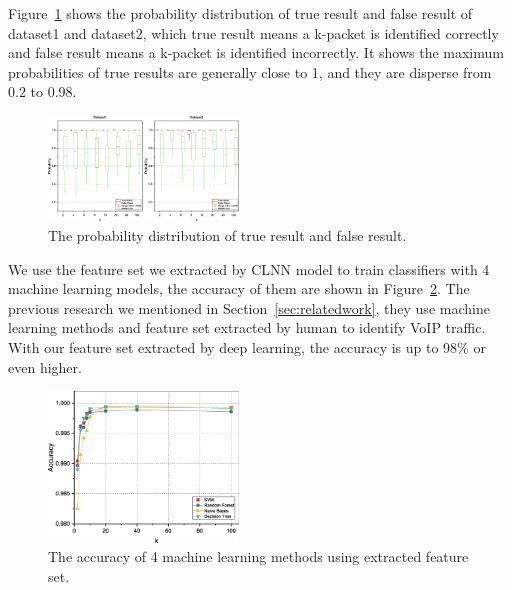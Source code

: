 \documentclass[conference]{IEEEtran}
\begin{document}
Figure~\ref{fig:tf} shows the probability distribution of true result and false result of dataset1 and dataset2, which true result means a k-packet is identified correctly and false result means a k-packet is identified incorrectly. It shows the maximum probabilities of true results are generally close to 1, and they are disperse from 0.2 to 0.98.
\begin{figure}[htp]
\begin{center}
\includegraphics[width=0.45\textwidth]{tf.eps}
\caption{The probability distribution of true result and false result.}\label{fig:tf}
\end{center}
\end{figure}
We use the feature set we extracted by CLNN model to train classifiers with 4 machine learning models, the accuracy of them are shown in Figure~\ref{fig:ml}. The previous research we mentioned in Section~\ref{sec:relatedwork}, they use machine learning methods and feature set extracted by human to identify VoIP traffic. With our feature set extracted by deep learning, the accuracy is up to 98\% or even higher.
\begin{figure}
  \centering
  \includegraphics[width=0.45\textwidth]{ml.eps}
  \caption{The accuracy of 4 machine learning methods using extracted feature set.}
  \label{fig:ml}
\end{figure}
\end{document}
